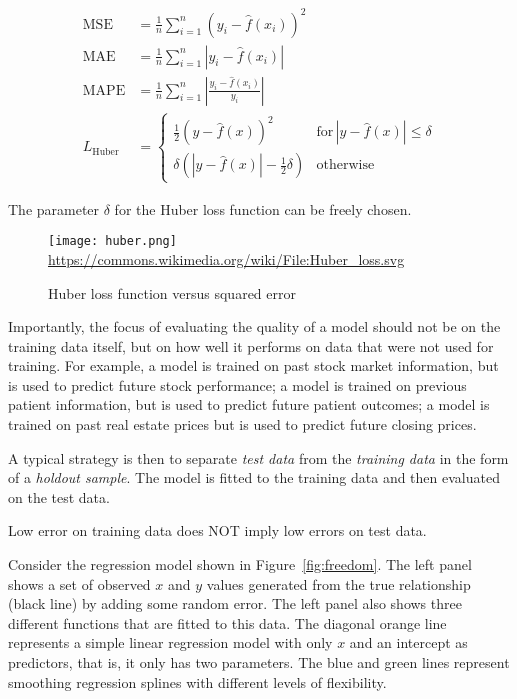 \begin{align*}
\operatorname{MSE} &= \frac{1}{n}\sum_{i=1}^n (y_i - \hat{f}(x_i))^2 \\
\operatorname{MAE} &= \frac{1}{n}\sum_{i=1}^n |y_i - \hat{f}(x_i)| \\
\operatorname{MAPE} &= \frac{1}{n}\sum_{i=1}^n | \frac{y_i - \hat{f}(x_i)}{y_i}| \\
L_{\text{Huber}} &= \begin{cases} \frac{1}{2}(y - \hat{f}(x))^2 & \text{for}\, |y-\hat{f}(x)| \leq \delta \\
\delta (|y - \hat{f}(x)| - \frac{1}{2}\delta) & \text{otherwise} \end{cases}
\end{align*}

\noindent The parameter $\delta$ for the Huber loss function can be freely chosen.

\begin{figure}
\centering
\texttt{[image: huber.png]}
\scriptsize \url{https://commons.wikimedia.org/wiki/File:Huber_loss.svg}
\caption{Huber loss function versus squared error}
\label{fig:huber}
\end{figure}

Importantly, the focus of evaluating the quality of a model should not be on the training data itself, but on how well it performs on data that were not used for training. For example, a model is trained on past stock market information, but is used to predict future stock performance; a model is trained on previous patient information, but is used to predict future patient outcomes; a model is trained on past real estate prices but is used to predict future closing prices. 

A typical strategy is then to separate \emph{test data} from the \emph{training data} in the form of a \emph{holdout sample}. The model is fitted to the training data and then evaluated on the test data.

\begin{tcolorbox}[colback=LavenderBlush2]
Low error on training data does NOT imply low errors on test data.
\end{tcolorbox}

Consider the regression model shown in Figure~\ref{fig:freedom}. The left panel shows a set of observed $x$ and $y$ values generated from the true relationship (black line) by adding some random error. The left panel also shows three different functions that are fitted to this data. The diagonal orange line represents a simple linear regression model with only $x$ and an intercept as predictors, that is, it only has two parameters. The blue and green lines represent smoothing regression splines with different levels of flexibility.

